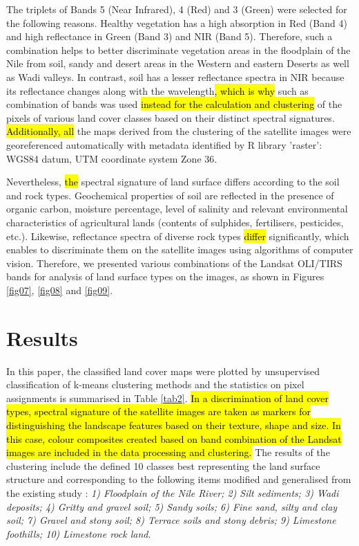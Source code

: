 \documentclass[information,article,submit,pdftex,moreauthors]{Definitions/mdpi}
\begin{document}
The triplets of Bands 5 (Near Infrared), 4 (Red) and 3 (Green) were selected for the following reasons. Healthy vegetation has a high absorption in Red (Band 4) and high reflectance in Green (Band 3) and NIR (Band 5). Therefore, such a combination helps to better discriminate vegetation areas in the floodplain of the Nile from soil, sandy and desert areas in the Western and eastern Deserts as well as Wadi valleys. In contrast, soil has a lesser reflectance spectra in NIR because its reflectance changes along with the wavelength\hl{, which is why }such as combination of bands was used \hl{instead for the calculation and clustering }of the pixels of various land cover classes based on their distinct spectral signatures. \hl{Additionally, all }the maps derived from the clustering of the satellite images were georeferenced automatically with metadata identified by R library 'raster': WGS84 datum, UTM coordinate system Zone 36.

Nevertheless, \hl{the }spectral signature of land surface differs according to the soil and rock types. Geochemical properties of soil are reflected in the presence of organic carbon, moisture percentage, level of salinity and relevant environmental characteristics of agricultural lands (contents of sulphides, fertilisers, pesticides, etc.). Likewise, reflectance spectra of diverse rock types \hl{differ }significantly, which enables to discriminate them on the satellite images using algorithms of computer vision. Therefore, we presented various combinations of the Landsat OLI/TIRS bands for analysis of land surface types on the images, as shown in Figures \ref{fig07}, \ref{fig08} and \ref{fig09}.

\section{Results}

In this paper, the classified land cover maps were plotted by unsupervised classification of k-means clustering methods and the statistics on pixel assignments is summarised in Table \ref{tab2}. \hl{In a discrimination of land cover types, spectral signature of the satellite images are taken as markers for distinguishing the landscape features based on their texture, shape and size. In this case, colour composites created based on band combination of the Landsat images are included in the data processing and clustering. }The results of the clustering include the defined 10 classes best representing the land surface structure and corresponding to the following items modified and generalised from the existing study \cite{Kamel}: \emph{1) Floodplain of the Nile River; 2) Silt sediments; 3) Wadi deposits; 4) Gritty and gravel soil;  5) Sandy soils; 6) Fine sand, silty and clay soil; 7) Gravel and stony soil; 8) Terrace soils and stony debris; 9) Limestone foothills; 
10) Limestone rock land}. 
\end{document}
